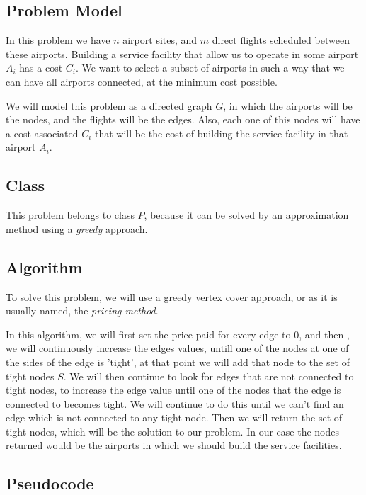 \documentclass{article}
\begin{document}
\subsection*{Problem Model}

In this problem we have $n$ airport sites, and $m$ direct flights scheduled between these airports. Building a service facility that allow us to operate in some airport $A_i$ has a cost $C_i$. We want to select a subset of airports in such a way that we can have all airports connected, at the minimum cost possible.

We will model this problem as a directed graph $G$, in which the airports will be the nodes, and the flights will be the edges. Also, each one of this nodes will have a cost associated $C_i$ that will be the cost of building the service facility in that airport $A_i$.

\subsection*{Class}

This problem belongs to class $P$, because it can be solved by an approximation method using a \textit{greedy} approach.

\subsection*{Algorithm}

To solve this problem, we will use a greedy vertex cover approach, or as it is usually named, the \textit{pricing method}.

In this algorithm, we will first set the price paid for every edge to $0$, and then , we will continuously increase the edges values, untill one of the nodes at one of the sides of the edge is 'tight', at that point we will add that node to the set of tight nodes $S$. We will then continue to look for edges that are not connected to tight nodes, to increase the edge value until one of the nodes that the edge is connected to becomes tight. We will continue to do this until we can't find an edge which is not connected to any tight node. Then we will return the set of tight nodes, which will be the solution to our problem. In our case the nodes returned would be the airports in which we should build the service facilities.

\subsection*{Pseudocode}
\end{document}
